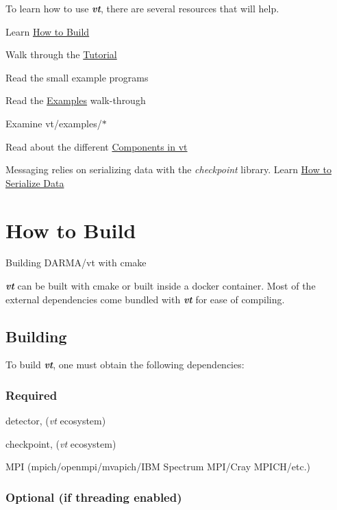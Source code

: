 To learn how to use {\bfseries {\itshape vt}}, there are several resources that will help.


\begin{DoxyItemize}
\item Learn \hyperlink{vt-build}{How to Build}
\item Walk through the \hyperlink{tutorial}{Tutorial}
\item Read the small example programs
\begin{DoxyItemize}
\item Read the \hyperlink{examples}{Examples} walk-\/through
\item Examine {\ttfamily vt/examples/$\ast$}
\end{DoxyItemize}
\item Read about the different \hyperlink{introduction_vt-components}{Components in vt}
\item Messaging relies on serializing data with the {\itshape checkpoint} library. Learn \hyperlink{ckpt_learn_serialize}{How to Serialize Data} 
\end{DoxyItemize}\hypertarget{vt-build}{}\section{How to Build}\label{vt-build}
Building D\+A\+R\+M\+A/vt with cmake

{\bfseries {\itshape vt}} can be built with {\ttfamily cmake} or built inside a {\ttfamily docker} container. Most of the external dependencies come bundled with {\bfseries {\itshape vt}} for ease of compiling.\hypertarget{vt-build_how-to-build}{}\subsection{Building}\label{vt-build_how-to-build}
To build {\bfseries {\itshape vt}}, one must obtain the following dependencies\+:\hypertarget{vt-build_required-deps}{}\subsubsection{Required}\label{vt-build_required-deps}

\begin{DoxyItemize}
\item detector, ({\itshape vt} ecosystem)
\item checkpoint, ({\itshape vt} ecosystem)
\item M\+PI (mpich/openmpi/mvapich/\+I\+BM Spectrum M\+P\+I/\+Cray M\+P\+I\+C\+H/etc.)
\end{DoxyItemize}\hypertarget{vt-build_optional-deps}{}\subsubsection{Optional (if threading enabled)}\label{vt-build_optional-deps}

